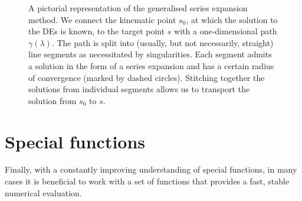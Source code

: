 \documentclass[main.tex]{subfiles}
\begin{document}
\begin{figure}
    \centering
    \caption{A pictorial representation of the generalised series expansion method. We connect the kinematic point $s_0$, at which the solution to the DEs is known, to the target point $s$ with a one-dimensional path $\gamma(\lambda)$. The path is split into (usually, but not necessarily, straight) line segments as necessitated by singularities. Each segment admits a solution in the form of a series expansion and has a certain radius of convergence (marked by dashed circles). Stitching together the solutions from individual segments allows us to transport the solution from $s_0$ to $s$.}
    \label{fig:seriesexp}
\end{figure}
%
\section{Special functions} \label{sec:specialfunctions}
Finally, with a constantly improving understanding of special functions, in many cases it is beneficial to work with a set of functions that provides a fast, stable numerical evaluation. 
\end{document}
